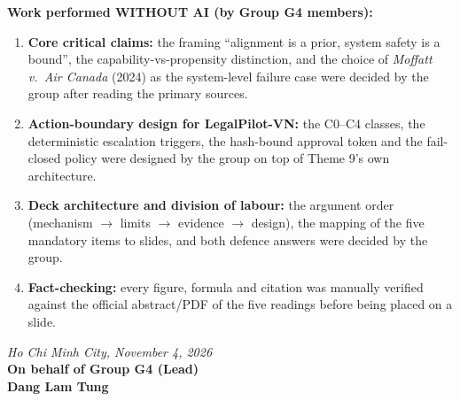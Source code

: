 \documentclass[11pt,a4paper]{article}
\begin{document}
\vspace{0.3cm}
\noindent \textbf{\large Work performed WITHOUT AI (by Group G4 members):}
\begin{enumerate}
  \item \textbf{Core critical claims:} the framing ``alignment is a prior, system safety is a bound'', the capability-vs-propensity distinction, and the choice of \emph{Moffatt v.\ Air Canada} (2024) as the system-level failure case were decided by the group after reading the primary sources.
  \item \textbf{Action-boundary design for LegalPilot-VN:} the C0--C4 classes, the deterministic escalation triggers, the hash-bound approval token and the fail-closed policy were designed by the group on top of Theme 9's own architecture.
  \item \textbf{Deck architecture and division of labour:} the argument order (mechanism $\to$ limits $\to$ evidence $\to$ design), the mapping of the five mandatory items to slides, and both defence answers were decided by the group.
  \item \textbf{Fact-checking:} every figure, formula and citation was manually verified against the official abstract/PDF of the five readings before being placed on a slide.
\end{enumerate}

\vspace{0.8cm}
\begin{flushright}
  \textit{Ho Chi Minh City, November 4, 2026}\\[0.2cm]
  \textbf{On behalf of Group G4 (Lead)}\\[1.5cm]
  \textbf{Dang Lam Tung}
\end{flushright}
\end{document}
